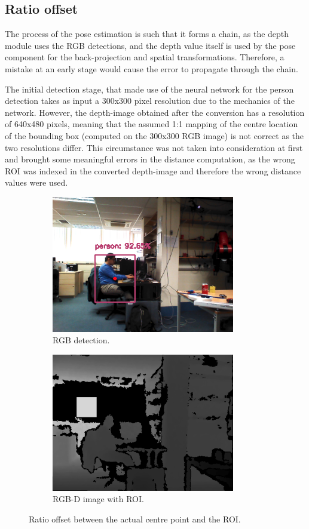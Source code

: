 \subsection{Ratio offset}

The process of the pose estimation is such that it forms a chain, as the depth module uses the RGB detections, and the depth value itself is used by the pose component for the back-projection and spatial transformations. Therefore, a mistake at an early stage would cause the error to propagate through the chain.

The initial detection stage, that made use of the neural network for the person detection takes as input a 300x300 pixel resolution due to the mechanics of the network. However, the depth-image obtained after the conversion has a resolution of 640x480 pixels, meaning that the assumed 1:1 mapping of the centre location of the bounding box (computed on the 300x300 RGB image) is not correct as the two resolutions differ. This circumstance was not taken into consideration at first and brought some meaningful errors in the distance computation, as the wrong ROI was indexed in the converted depth-image and therefore the wrong distance values were used.

\begin{figure}[H]
	\centering
    \begin{subfigure}{.6\textwidth}
      \centering
      \includegraphics[width=8cm]{images/chapter4_rgb_ratio.png}
      \caption{RGB detection.}
      \label{fig:ratin}
    \end{subfigure}%
    
    \begin{subfigure}{.6\textwidth}
      \centering
      \includegraphics[width=8cm]{images/chapter4_rgbd_no_ratio.png}
      \caption{RGB-D image with ROI.}
      \label{fig:ration}
    \end{subfigure}%
    
    \caption{Ratio offset between the actual centre point and the ROI.}
\end{figure}
\clearpage

